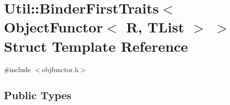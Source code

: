 \hypertarget{structUtil_1_1Private_1_1BinderFirstTraits_3_01ObjectFunctor_3_01R_00_01TList_01_4_01_4}{}\section{Util\+:\+:Binder\+First\+Traits$<$ Object\+Functor$<$ R, T\+List $>$ $>$ Struct Template Reference}
\label{structUtil_1_1Private_1_1BinderFirstTraits_3_01ObjectFunctor_3_01R_00_01TList_01_4_01_4}


{\ttfamily \#include $<$objfunctor.\+h$>$}

\subsection*{Public Types}
